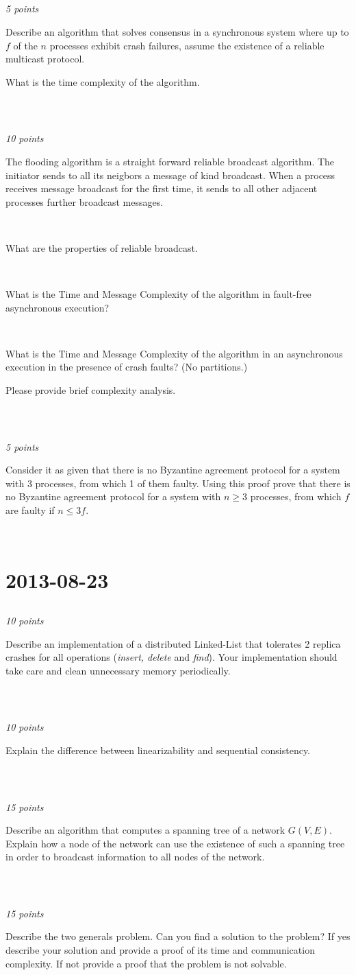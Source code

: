 \documentclass[a4paper]{article}
\newcommand{\points}[1]{\subsection{} \textit{#1 points}\\}
\newcommand{\question}[2][]{
  \parbox[t]{\textwidth}{
    \ifthenelse{\equal{#1}{}}{}{#1)}
    \parbox[t]{0.95\textwidth}{#2}}\\}
\begin{document}
\points{5}
\question{
  Describe an algorithm that solves consensus in a synchronous
  system where up to $f$ of the $n$ processes exhibit crash failures,
  assume the existence of a reliable multicast protocol.

  What is the time complexity of the algorithm.
}

\points{10}
\question{
  The flooding algorithm is a straight forward reliable
  broadcast algorithm. The initiator sends to all its neigbors a
  message of kind broadcast. When a process receives message broadcast
  for the first time, it sends to all other adjacent processes
  further broadcast messages.
}
\question[a]{
  What are the properties of reliable broadcast.
}
\question[b]{
  What is the Time and Message Complexity of the algorithm
  in fault-free asynchronous execution?
}
\question[c]{
  What is the Time and Message Complexity of the algorithm
  in an asynchronous execution in the presence of crash faults? (No
  partitions.)

  Please provide brief complexity analysis.
}

\points{5}
\question{
  Consider it as given that there is no Byzantine agreement
  protocol for a system with 3 processes, from which 1 of them
  faulty. Using this proof prove that there is no Byzantine agreement
  protocol for a system with $n \geq 3$ processes, from which $f$ are
  faulty if $n \leq 3f$.
}

\section{2013-08-23}
\points{10}
\question{Describe an implementation of a distributed
  Linked-List that tolerates 2 replica crashes for all operations
  (\textit{insert, delete} and \textit{find}). Your implementation
  should take care and clean unnecessary memory periodically.}

\points{10}
\label{2013-08:linearizability}
\question{Explain the difference between linearizability
  and sequential consistency.}

\points{15}
\question{Describe an algorithm that computes a spanning
  tree of a network $G(V,E)$. Explain how a node of the network can use
  the existence of such a spanning tree in order to broadcast
  information to all nodes of the network.}

\points{15}
\question{Describe the two generals problem. Can you find
  a solution to the problem? If yes describe your solution and provide a
  proof of its time and communication complexity. If not provide a proof
  that the problem is not solvable. }
\end{document}
